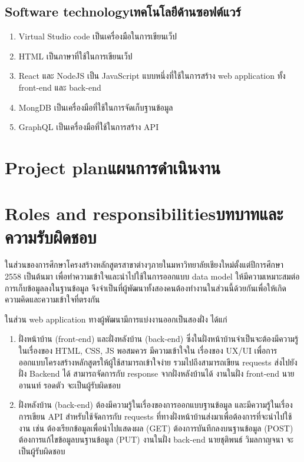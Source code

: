 \subsection{\ifenglish Software technology\else เทคโนโลยีด้านซอฟต์แวร์\fi}

\begin{enumerate}
    \item Virtual Studio code เป็นเครื่องมือในการเขียนเว็ป
    \item HTML เป็นภาษาที่ใช้ในการเขียนเว็ป
    \item React และ NodeJS เป็น JavaScript แบบหนึ่งที่ใช้ในการสร้าง web application ทั้ง front-end และ back-end  
    \item MongDB เป็นเครื่องมือที่ใช้ในการจัดเก็บฐานข้อมูล
    \item GraphQL เป็นเครื่องมือที่ใช้ในการสร้าง API 
\end{enumerate}

\section{\ifenglish Project plan\else แผนการดำเนินงาน\fi}


\section{\ifenglish Roles and responsibilities\else บทบาทและความรับผิดชอบ\fi}

ในส่วนของการศึกษาโครงสร้างหลักสูตรสาขาต่างๆภายในมหาวิทยาลัยเชียงใหม่ตั้งแต่ปีการศึกษา 2558 เป็นต้นมา เพื่อทำความเข้าใจและนําไปใช้ในการออกแบบ data model ให้มีความเหมาะสมต่อการเก็บข้อมูลลงในฐานข้อมูล จึงจำเป็นที่ผู้พัฒนาทั้งสองคนต้องทำงานในส่วนนี้ด้วยกันเพื่อให้เกิดความคิดและความเข้าใจที่ตรงกัน 
	
ในส่วน web application ทางผู้พัฒนามีการแบ่งงานออกเป็นสองฝั่ง ได้แก่ 

\begin{enumerate}
    
    \item ฝั่งหน้าบ้าน (front-end) และฝั่งหลังบ้าน (back-end) ซึ่งในฝั่งหน้าบ้านจําเป็นจะต้องมีความรู้ในเรื่องของ HTML, CSS, JS พอสมควร มีความเข้าใจใน เรื่องของ UX/UI เพื่อการออกแบบโครงสร้างหลักสูตรให้ผู้ใช้สามารถเข้าใจง่าย รวมไปถึงสามารถเขียน requests ส่งไปยังฝั่ง Backend ได้ สามารถจัดการกับ response จากฝั่งหลังบ้านได้ งานในฝั่ง front-end นายอานนท์ รอดตัว จะเป็นผู้รับผิดชอบ
    \item ฝั่งหลังบ้าน (back-end) ต้องมีความรู้ในเรื่องของการออกแบบฐานข้อมูล และมีความรู้ในเรื่องการเขียน API สําหรับใช้จัดการกับ requests ที่ทางฝั่งหน้าบ้านส่งมาเพื่อต้องการที่จะนําไปใช้งาน เช่น ต้องเรียกข้อมูลเพื่อนำไปแสดงผล (GET) ต้องการบันทึกลงบนฐานข้อมูล (POST) ต้องการแก้ไขข้อมูลบนฐานข้อมูล (PUT) งานในฝั่ง back-end นายชุติพนธ์ วิมลกาญจนา จะเป็นผู้รับผิดชอบ

\end{enumerate}



